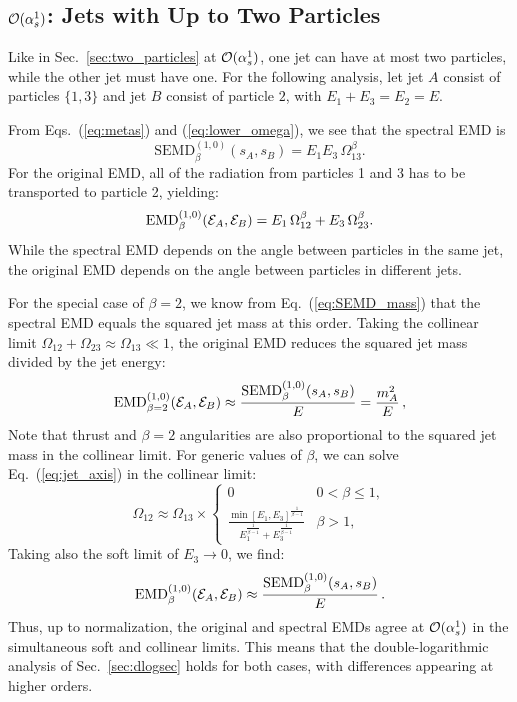 \documentclass[letterpaper,11pt]{article}
\DeclareRobustCommand{\Sec}[1]{Sec.~\ref{#1}}
\DeclareRobustCommand{\Eq}[1]{Eq.~(\ref{#1})}
\DeclareRobustCommand{\Eqs}[2]{Eqs.~(\ref{#1}) and (\ref{#2})}
\begin{document}
\subsection{${\cal O}(\alpha_s^1)$: Jets with Up to Two Particles}
\label{sec:original_EMD_a1}

Like in \Sec{sec:two_particles} at ${\cal O}(\alpha_s^1)$, one jet can have at most two particles, while the other jet must have one.
%
For the following analysis, let jet $A$ consist of particles $\{1,3\}$ and jet $B$ consist of particle $2$, with $E_1 + E_3 = E_2 = E$.


From \Eqs{eq:metas}{eq:lower_omega}, we see that the spectral EMD is
%
\begin{equation}
\text{SEMD}^{(1,0)}_{\beta}(s_A, s_B)  = E_1 E_3 \, \Omega_{13}^\beta.
\end{equation}
%
For the original EMD, all of the radiation from particles 1 and 3 has to be transported to particle 2, yielding:
%
\begin{align}\label{eq:emdexact}
\text{EMD}^{(1,0)}_{\beta}({\cal E}_A,{\cal E}_B)= E_1\,\Omega_{12}^\beta+E_3\, \Omega_{23}^\beta.
\end{align}
%
While the spectral EMD depends on the angle between particles in the same jet, the original EMD depends on the angle between particles in different jets.


For the special case of $\beta = 2$, we know from \Eq{eq:SEMD_mass} that the spectral EMD equals the squared jet mass at this order.
%
Taking the collinear limit $\Omega_{12} + \Omega_{23} \approx \Omega_{13}\ll 1$, the original EMD reduces the squared jet mass divided by the jet energy:
%
\begin{equation}
\text{EMD}^{(1,0)}_{\beta=2}({\cal E}_A,{\cal E}_B) \approx \frac{\text{SEMD}^{(1,0)}_{\beta}(s_A, s_B)}{E} = \frac{m_A^2}{E}\,,
\end{equation}
%
Note that thrust and $\beta = 2$ angularities \cite{Farhi:1977sg,Berger:2003iw,Ellis:2010rwa} are also proportional to the squared jet mass in the collinear limit. 
%
For generic values of $\beta$, we can solve \Eq{eq:jet_axis} in the collinear limit:
%
\begin{equation}
\Omega_{12} \approx \Omega_{13} \times
	\begin{cases}
	0 & 0< \beta \leq 1, \\
	\frac{\min[E_1, E_3]^{\frac{1}{\beta - 1}}}{E_1^{\frac{1}{\beta - 1}}+ {E_3^{\frac{1}{\beta - 1}}}} & \beta > 1,
	\end{cases}
\end{equation}
%
Taking also the soft limit of $E_3 \to 0$, we find: 
%
\begin{equation}
\text{EMD}^{(1,0)}_{\beta}({\cal E}_A,{\cal E}_B) \approx \frac{\text{SEMD}^{(1,0)}_{\beta}(s_A, s_B)}{E} \,. 
\end{equation}
%
Thus, up to normalization, the original and spectral EMDs agree at ${\cal O}(\alpha_s^1)$ in the simultaneous soft and collinear limits.
%
This means that the double-logarithmic analysis of \Sec{sec:dlogsec} holds for both cases, with differences appearing at higher orders.
\end{document}
